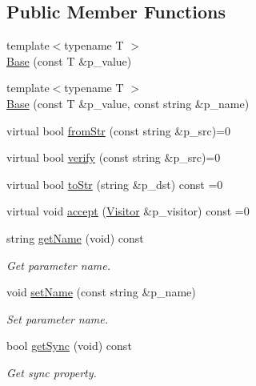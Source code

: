 \subsection*{Public Member Functions}
\begin{DoxyCompactItemize}
\item 
{\footnotesize template$<$typename T $>$ }\\\hyperlink{classxtd_1_1servers_1_1param_1_1Base_ae7148147e419f2a3e5b27929e8b99b54}{Base} (const T \&p\-\_\-value)
\item 
{\footnotesize template$<$typename T $>$ }\\\hyperlink{classxtd_1_1servers_1_1param_1_1Base_aeadfa5af86a0dd70c6068a994f7ff567}{Base} (const T \&p\-\_\-value, const string \&p\-\_\-name)
\item 
virtual bool \hyperlink{classxtd_1_1servers_1_1param_1_1Base_a74a64bb56c20b892c9be9b786a2d94d1}{from\-Str} (const string \&p\-\_\-src)=0
\item 
virtual bool \hyperlink{classxtd_1_1servers_1_1param_1_1Base_a74d9a61d65e6e66492b2205489d9b2cf}{verify} (const string \&p\-\_\-src)=0
\item 
virtual bool \hyperlink{classxtd_1_1servers_1_1param_1_1Base_ab80c9c70cacf5a8cebb98486fba83116}{to\-Str} (string \&p\-\_\-dst) const =0
\item 
virtual void \hyperlink{classxtd_1_1servers_1_1param_1_1Base_a37a0c2247274dce2395517186ec70d7a}{accept} (\hyperlink{classxtd_1_1servers_1_1param_1_1Visitor}{Visitor} \&p\-\_\-visitor) const =0
\item 
string \hyperlink{classxtd_1_1servers_1_1param_1_1Base_a1e688aa518e874229d45a348c7596c82}{get\-Name} (void) const 
\begin{DoxyCompactList}\small\item\em Get parameter name. \end{DoxyCompactList}\item 
void \hyperlink{classxtd_1_1servers_1_1param_1_1Base_af0a668bb0360d7c2a8821527888d16d2}{set\-Name} (const string \&p\-\_\-name)
\begin{DoxyCompactList}\small\item\em Set parameter name. \end{DoxyCompactList}\item 
bool \hyperlink{classxtd_1_1servers_1_1param_1_1Base_a3d83345a6e83bbe96cb7e13c81061c7d}{get\-Sync} (void) const 
\begin{DoxyCompactList}\small\item\em Get sync property. \end{DoxyCompactList}\item 

\end{DoxyCompactItemize}
